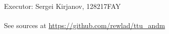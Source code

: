 \documentclass{article}
\begin{document}
Executor: Sergei Kirjanov, 128217FAY \\
\\
See sources at \url{https://github.com/rewlad/ttu_andm} \\




\clearpage

\clearpage


\end{document}

